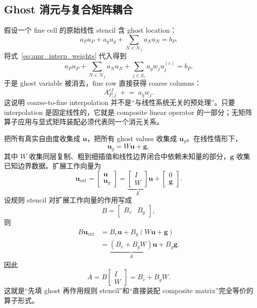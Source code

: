 \subsection{Ghost 消元与复合矩阵耦合}

假设一个 fine cell 的原始线性 stencil 含 ghost location：
\begin{equation}
a_Pu_P+a_gu_g+
\sum_{N\in\mathcal N_f}a_Nu_N=b_P.
\label{eq:amr_row_with_ghost}
\end{equation}
将式~\eqref{eq:amr_interp_weights} 代入得到
\begin{equation}
a_Pu_P
+\sum_{N\in\mathcal N_f}a_Nu_N
+\sum_{j\in\mathcal S_c}a_gw_j u_j^{(c)}
=b_P.
\label{eq:amr_row_after_ghost_elimination}
\end{equation}
于是 ghost variable 被消去，fine row 直接获得 coarse columns：
\begin{equation}
\boxed{
A_{P,j}^{cf}\;\mathrel{+}=\;a_gw_j.
}
\end{equation}
这说明 coarse-to-fine interpolation 并不是“与线性系统无关的预处理”。只要 interpolation 是固定线性的，它就是 composite linear operator 的一部分；无矩阵算子应用与显式矩阵装配必须代表同一个消元关系。

把所有真实自由度收集成 $\bm u$，把所有 ghost values 收集成 $\bm u_g$。在线性情形下，
\begin{equation}
\boxed{
\bm u_g=W\bm u+\bm g,
}
\label{eq:amr-ghost-linear-map}
\end{equation}
其中 $W$ 收集同层复制、粗到细插值和线性边界闭合中依赖未知量的部分，$\bm g$ 收集已知边界数据。扩展工作向量为
\begin{equation}
\bm u_{\mathrm{ext}}
=
\begin{bmatrix}
\bm u\\
\bm u_g
\end{bmatrix}
=
\underbrace{
\begin{bmatrix}
I\\
W
\end{bmatrix}}_{E}
\bm u
+
\begin{bmatrix}
0\\
\bm g
\end{bmatrix}.
\label{eq:amr-extended-work-vector}
\end{equation}
设规则 stencil 对扩展工作向量的作用写成
\begin{equation}
B=
\begin{bmatrix}
B_v&B_g
\end{bmatrix},
\end{equation}
则
\begin{align}
B\bm u_{\mathrm{ext}}
&=
B_v\bm u+B_g(W\bm u+\bm g)\\
&=
\underbrace{(B_v+B_gW)}_{A}\bm u+B_g\bm g.
\end{align}
因此
\begin{equation}
\boxed{
A
=
B
\begin{bmatrix}
I\\W
\end{bmatrix}
=
B_v+B_gW.
}
\label{eq:amr-ghost-elimination-factorization}
\end{equation}
这就是“先填 ghost 再作用规则 stencil”和“直接装配 composite matrix”完全等价的算子形式。

